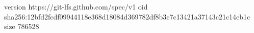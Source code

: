 version https://git-lfs.github.com/spec/v1
oid sha256:12bfd2fcdf09944118e368d18084d369782df8b3c7c13421a37143c21c14cb1c
size 786528
